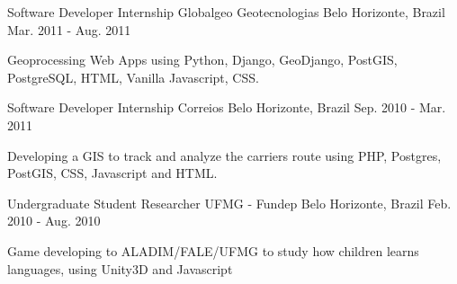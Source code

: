 \begin{cventries}
  \cventry
    {Software Developer Internship} %
    {Globalgeo Geotecnologias} %
    {Belo Horizonte, Brazil} %
    {Mar. 2011 - Aug. 2011} %
    {
      \begin{cvitems} %
        \item {Geoprocessing Web Apps using Python, Django, GeoDjango, PostGIS, PostgreSQL, HTML, Vanilla Javascript, CSS.}
      \end{cvitems}
    }

  \cventry
    {Software Developer Internship} %
    {Correios} %
    {Belo Horizonte, Brazil} %
    {Sep. 2010 - Mar. 2011} %
    {
      \begin{cvitems} %
        \item {Developing a GIS to track and analyze the carriers route using PHP, Postgres, PostGIS, CSS, Javascript and HTML.}
      \end{cvitems}
    }

  \cventry
    {Undergraduate Student Researcher} %
    {UFMG - Fundep} %
    {Belo Horizonte, Brazil} %
    {Feb. 2010 - Aug. 2010} %
    {
      \begin{cvitems} %
        \item {Game developing to ALADIM/FALE/UFMG to study how children learns languages, using Unity3D and Javascript}
      \end{cvitems}
    }

\end{cventries}
